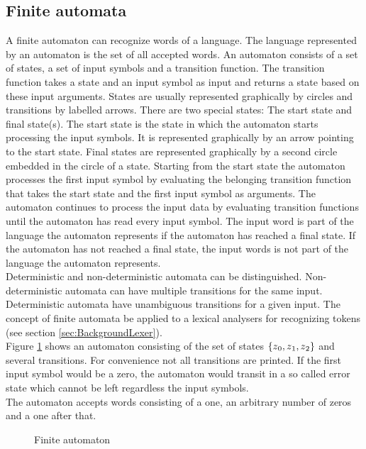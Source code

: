\subsection{Finite automata}\label{sec:BackgroundAutomata}
A finite automaton can recognize words of a language.
The language represented by an automaton is the set of all accepted words.
An automaton consists of a set of states, a set of input symbols and a transition function.
The transition function takes a state and an input symbol as input and returns a state based on these input arguments.
States are usually represented graphically by circles and transitions by labelled arrows.
There are two special states: The start state and final state(s).
The start state is the state in which the automaton starts processing the input symbols.
It is represented graphically by an arrow pointing to the start state.
Final states are represented graphically by a second circle embedded in the circle of a state.
Starting from the start state the automaton processes the first input symbol by evaluating the belonging transition function that takes the start state and the first input symbol as arguments. The automaton continues to process the input data by evaluating transition functions until the automaton has read every input symbol. The input word is part of the language the automaton represents if the automaton has reached a final state. If the automaton has not reached a final state, the input words is not part of the language the automaton represents.\\
Deterministic and non-deterministic automata can be distinguished.
Non-deterministic automata can have multiple transitions for the same input.
Deterministic automata have unambiguous transitions for a given input.
The concept of finite automata be applied to a lexical analysers for recognizing tokens (see section \ref{sec:BackgroundLexer}). \cite{AutomataTheory.2007}\\
Figure \ref{fig:FiniteAutomaton} shows an automaton consisting of the set of states $\{z\textsubscript{0}, z\textsubscript{1}, z\textsubscript{2}\}$ and several transitions. For convenience not all transitions are printed.
If the first input symbol would be a zero, the automaton would transit in a so called error state which cannot be left regardless the input symbols.\\
The automaton accepts words consisting of a one, an arbitrary number of zeros and a one after that.

\begin{figure}[H]
\centering
{}
\caption{Finite automaton}
\label{fig:FiniteAutomaton}
\end{figure}

